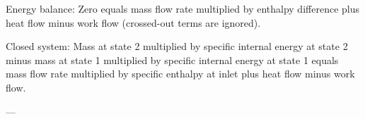 Energy balance:  
Zero equals mass flow rate multiplied by enthalpy difference plus heat flow minus work flow (crossed-out terms are ignored).  

Closed system:  
Mass at state 2 multiplied by specific internal energy at state 2 minus mass at state 1 multiplied by specific internal energy at state 1 equals mass flow rate multiplied by specific enthalpy at inlet plus heat flow minus work flow.  

---